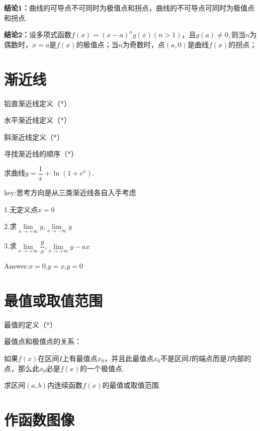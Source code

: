\documentclass[12pt, a4paper, oneside]{ctexbook}
\begin{document}
\textbf{结论1：}曲线的可导点不可同时为极值点和拐点，曲线的不可导点可同时为极值点和拐点.

\textbf{结论2：}设多项式函数$f(x)=(x-a)^n g(x)(n>1)$，且$g(a)\neq 0,$则当$n$为偶数时，$x=a$是$f(x)$的极值点；当$n$为奇数时，点$(a,0)$是曲线$f(x)$的拐点；


\section{渐近线}

铅直渐近线定义（*）

水平渐近线定义（*）

斜渐近线定义（*）

寻找渐近线的顺序（*）

\hspace*{\fill}

求曲线$y=\dfrac{1}{x}+\ln(1+e^x)$.

\hspace*{\fill}

key:思考方向是从三类渐近线各自入手考虑

1.无定义点$x=0$  

2.求$\lim\limits_{x \to +\infty}y$,$\lim\limits_{x \to -\infty}y$

3.求$\lim\limits_{x \to +\infty}\dfrac{y}{x}$,$\lim\limits_{x \to +\infty}y-ax$

Answer:$x=0$,$y=x$,$y=0$

\hspace*{\fill}


\section{最值或取值范围}

最值的定义（*）

最值点和极值点的关系：

如果$f(x)$在区间$I$上有最值点$x_0$，并且此最值点$x_0$不是区间$I$的端点而是$I$内部的点，那么此$x_0$必是$f(x)$的一个极值点.

\hspace*{\fill}

求区间$(a,b)$内连续函数$f(x)$的最值或取值范围.

\hspace*{\fill}

\section{作函数图像}
\end{document}
